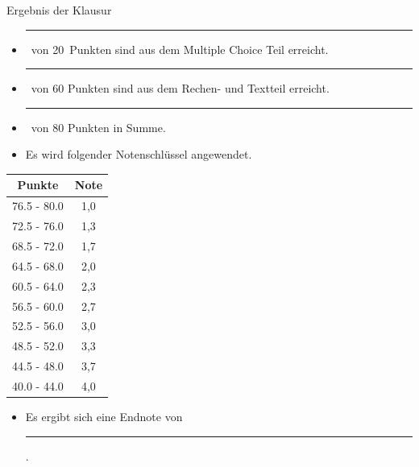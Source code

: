 \documentclass[a4paper, 9pt]{scrartcl}\usepackage[]{graphicx}\usepackage[]{xcolor}
\begin{document}
\begin{graybox}{Ergebnis der Klausur}
  \vspace{1Ex}
  \begin{itemize}
  \item[] \rule[0ex]{3em}{.4pt}\, von 20\, Punkten sind aus dem Multiple
    Choice Teil erreicht.
  \item[] \rule[0ex]{3em}{.4pt}\, von 60 Punkten sind aus dem Rechen- und
    Textteil erreicht. 
  \item[] \rule[0ex]{3em}{.4pt}\, von 80 Punkten in Summe.
  \item[] Es wird folgender Notenschl{\"u}ssel angewendet.   
  \end{itemize}
  \vspace{1ex}
\begin{center}
  \begin{tabular}[c]{cc}
    \toprule
    \textbf{Punkte}	&	\textbf{Note}	\\
    \midrule
    76.5 - 80.0	&	1,0	\\
    72.5 - 76.0	&	1,3	\\
    68.5 - 72.0	&	1,7	\\
    64.5 - 68.0	&	2,0	\\
    60.5 - 64.0	&	2,3	\\
    56.5 - 60.0	&	2,7	\\
    52.5 - 56.0	&	3,0	\\
    48.5 - 52.0	&	3,3	\\
    44.5 - 48.0	&	3,7	\\
    40.0 - 44.0	&	4,0	\\
    \bottomrule
  \end{tabular}
\end{center}
  \vspace{1ex}
\begin{itemize}
\item[] Es ergibt sich eine Endnote von \rule[0ex]{4em}{.4pt}.
\end{itemize}
  \vspace{1Ex}
\end{graybox}

\newpage
\end{document}
